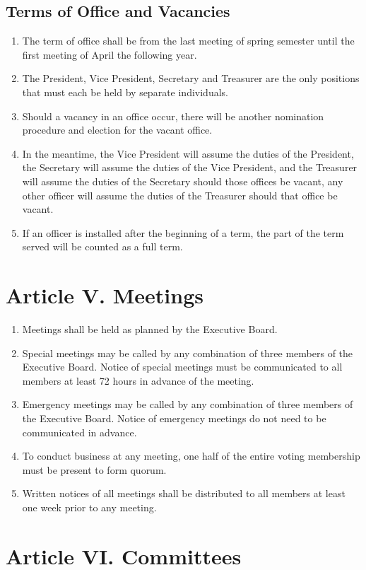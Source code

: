 \documentclass[12pt]{scrartcl} %
\begin{document}
	\subsection{Terms of Office and Vacancies}
		\begin{enumerate}
			\item The term of office shall be from the last meeting of spring semester until the first meeting of April the following year.
			\item The President, Vice President, Secretary and Treasurer are the only positions that must each be held by separate individuals.
			\item Should a vacancy in an office occur, there will be another nomination procedure and election for the vacant office.
			\item In the meantime, the Vice President will assume the duties of the President, the Secretary will assume the duties of the Vice President, and the Treasurer will assume the duties of the Secretary should those offices be vacant, any other officer will assume the duties of the Treasurer should that office be vacant.
			\item If an officer is installed after the beginning of a term, the part of the term served will be counted as a full term.
		\end{enumerate}
\section{Article V. Meetings}

		\begin{enumerate}
			\item Meetings shall be held as planned by the Executive Board.
			\item Special meetings may be called by any combination of three members of the Executive Board. Notice of special meetings must be communicated to all members at least 72 hours in advance of the meeting.
			\item Emergency meetings may be called by any combination of three members of the Executive Board.  Notice of emergency meetings do not need to be communicated in advance.
			\item To conduct business at any meeting, one half of the entire voting membership must be present to form quorum.
			\item  Written notices of all meetings shall be distributed to all members at least one week prior to any meeting.
		\end{enumerate}
\section{Article VI. Committees}
\end{document}
